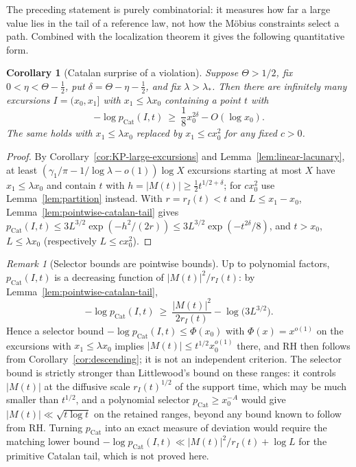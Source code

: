 \documentclass[11pt]{amsart}
\numberwithin{equation}{section}
\theoremstyle{plain}
\newtheorem{corollary}[theorem]{Corollary}
\theoremstyle{definition}
\theoremstyle{remark}
\newtheorem{remark}[theorem]{Remark}
\begin{document}
The preceding statement is purely combinatorial: it measures how far a large
value lies in the tail of a reference law, not how the M\"obius constraints
select a path. Combined with the localization theorem it gives the following
quantitative form.

\begin{corollary}[Catalan surprise of a violation]
\label{cor:catalan-surprise}
\label{thm:catalan-selector-square}
Suppose $\Theta>1/2$, fix $0<\eta<\Theta-\frac12$, put
$\delta=\Theta-\eta-\frac12$, and fix $\lambda>\lambda_*$. Then there are
infinitely many excursions $I=(x_0,x_1]$ with $x_1\le\lambda x_0$ containing
a point $t$ with
\begin{equation}
\label{eq:KP-catalan-surprise}
-\log p_{\mathrm{Cat}}(I,t)\ \ge\ \frac18x_0^{2\delta}-O(\log x_0).
\end{equation}
The same holds with $x_1\le\lambda x_0$ replaced by $x_1\le cx_0^2$ for any
fixed $c>0$.
\end{corollary}

\begin{proof}
By Corollary~\ref{cor:KP-large-excursions} and Lemma~\ref{lem:linear-lacunary},
at least $(\gamma_1/\pi-1/\log\lambda-o(1))\log X$ excursions starting at
most $X$ have $x_1\le\lambda x_0$ and contain $t$ with
$h=|M(t)|\ge\frac12t^{1/2+\delta}$; for $cx_0^2$ use
Lemma~\ref{lem:partition} instead. With $r=r_I(t)<t$ and $L\le x_1-x_0$,
Lemma~\ref{lem:pointwise-catalan-tail} gives
$p_{\mathrm{Cat}}(I,t)\le3L^{3/2}\exp(-h^2/(2r))\le3L^{3/2}\exp(-t^{2\delta}/8)$,
and $t>x_0$, $L\le\lambda x_0$ (respectively $L\le cx_0^2$).
\end{proof}

\begin{remark}[Selector bounds are pointwise bounds]
\label{rem:catalan-selector-gap}
Up to polynomial factors, $p_{\mathrm{Cat}}(I,t)$ is a decreasing function of
$|M(t)|^2/r_I(t)$: by Lemma~\ref{lem:pointwise-catalan-tail},
\[
-\log p_{\mathrm{Cat}}(I,t)\ \ge\ \frac{|M(t)|^2}{2r_I(t)}-\log\bigl(3L^{3/2}\bigr).
\]
Hence a selector bound $-\log p_{\mathrm{Cat}}(I,t)\le\Phi(x_0)$ with
$\Phi(x)=x^{o(1)}$ on the excursions with $x_1\le\lambda x_0$ implies
$|M(t)|\le t^{1/2}x_0^{o(1)}$ there, and RH then follows from
Corollary~\ref{cor:descending}; it is not an independent criterion. The
selector bound is strictly stronger than Littlewood's bound on these
ranges: it controls $|M(t)|$ at the diffusive scale $r_I(t)^{1/2}$ of the
support time, which may be much smaller than $t^{1/2}$, and a polynomial
selector $p_{\mathrm{Cat}}\ge x_0^{-A}$ would give $|M(t)|\ll\sqrt{t\log t}$
on the retained ranges, beyond any bound known to follow from RH. Turning
$p_{\mathrm{Cat}}$ into an exact measure of deviation would require the
matching lower bound $-\log p_{\mathrm{Cat}}(I,t)\ll|M(t)|^2/r_I(t)+\log L$
for the primitive Catalan tail, which is not proved here.
\end{remark}
\end{document}
